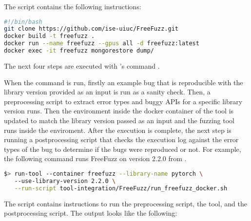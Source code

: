 \documentclass[sigconf,screen]{acmart}
\begin{document}
\noindent
The script  contains the
following instructions:

\begin{lstlisting}[language=bash,basicstyle=\small,keywords={}]
#!/bin/bash
git clone https://github.com/ise-uiuc/FreeFuzz.git
docker build -t freefuzz .
docker run --name freefuzz --gpus all -d freefuzz:latest
docker exec -it freefuzz mongorestore dump/
\end{lstlisting}

The next four steps are executed with \tname's command
.

When the command is run, firstly an example bug that is reproducible with the library version provided as an input is run as a sanity check. Then, a preprocessing script to extract error types and buggy APIs for a specific library version runs.
Then the environment inside
the docker container of the tool is updated to match the library version passed as an input and the fuzzing tool runs inside the enviroment. After the execution is complete, the next step is running a postprocessing script that checks the execution log against the error types of the bug to determine if the bugs were reproduced or not.
For example, the following command runs FreeFuzz
on version 2.2.0 from \torch.

\begin{lstlisting}[language=bash,basicstyle=\small,keywords={}]
$> run-tool --container freefuzz --library-name pytorch \ 
   --use-library-version 2.2.0 \
   --run-script tool-integration/FreeFuzz/run_freefuzz_docker.sh
\end{lstlisting}

The script  contains instructions to run the preprocessing script, the tool, and the postprocessing script.
The output looks like the following:
\end{document}
